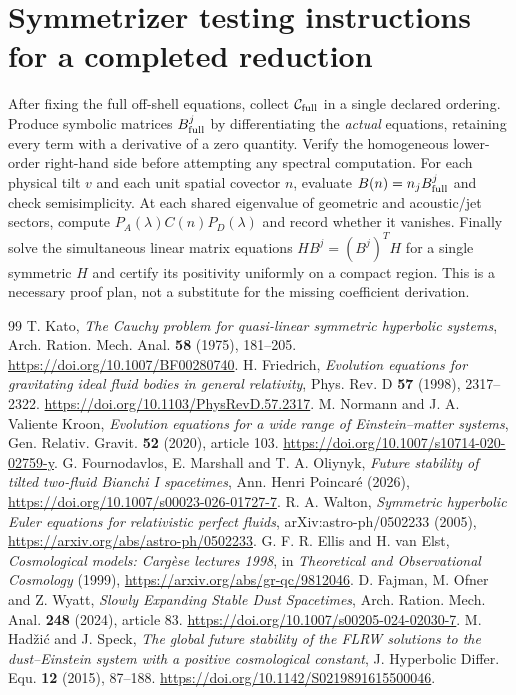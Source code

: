 \documentclass[11pt,a4paper]{article}
\newcommand{\cC}{\mathcal C}
\begin{document}
\section{Symmetrizer testing instructions for a completed reduction}
After fixing the full off-shell equations, collect $\cC_{\rm full}$ in a single declared ordering. Produce symbolic matrices $B^j_{\rm full}$ by differentiating the \emph{actual} equations, retaining every term with a derivative of a zero quantity. Verify the homogeneous lower-order right-hand side before attempting any spectral computation. For each physical tilt $v$ and each unit spatial covector $n$, evaluate $B(n)=n_jB^j_{\rm full}$ and check semisimplicity. At each shared eigenvalue of geometric and acoustic/jet sectors, compute $P_A(\lambda)C(n)P_D(\lambda)$ and record whether it vanishes. Finally solve the simultaneous linear matrix equations $HB^j=(B^j)^TH$ for a single symmetric $H$ and certify its positivity uniformly on a compact region. This is a necessary proof plan, not a substitute for the missing coefficient derivation.

\begin{thebibliography}{99}
 T. Kato, \emph{The Cauchy problem for quasi-linear symmetric hyperbolic systems}, Arch. Ration. Mech. Anal. \textbf{58} (1975), 181--205. \url{https://doi.org/10.1007/BF00280740}.
 H. Friedrich, \emph{Evolution equations for gravitating ideal fluid bodies in general relativity}, Phys. Rev. D \textbf{57} (1998), 2317--2322. \url{https://doi.org/10.1103/PhysRevD.57.2317}.
 M. Normann and J. A. Valiente Kroon, \emph{Evolution equations for a wide range of Einstein--matter systems}, Gen. Relativ. Gravit. \textbf{52} (2020), article 103. \url{https://doi.org/10.1007/s10714-020-02759-y}.
 G. Fournodavlos, E. Marshall and T. A. Oliynyk, \emph{Future stability of tilted two-fluid Bianchi I spacetimes}, Ann. Henri Poincar\'e (2026), \url{https://doi.org/10.1007/s00023-026-01727-7}.
 R. A. Walton, \emph{Symmetric hyperbolic Euler equations for relativistic perfect fluids}, arXiv:astro-ph/0502233 (2005), \url{https://arxiv.org/abs/astro-ph/0502233}.
 G. F. R. Ellis and H. van Elst, \emph{Cosmological models: Carg\`ese lectures 1998}, in \emph{Theoretical and Observational Cosmology} (1999), \url{https://arxiv.org/abs/gr-qc/9812046}.
 D. Fajman, M. Ofner and Z. Wyatt, \emph{Slowly Expanding Stable Dust Spacetimes}, Arch. Ration. Mech. Anal. \textbf{248} (2024), article 83. \url{https://doi.org/10.1007/s00205-024-02030-7}.
 M. Had\v{z}i\'c and J. Speck, \emph{The global future stability of the FLRW solutions to the dust--Einstein system with a positive cosmological constant}, J. Hyperbolic Differ. Equ. \textbf{12} (2015), 87--188. \url{https://doi.org/10.1142/S0219891615500046}.
\end{thebibliography}
\end{document}

